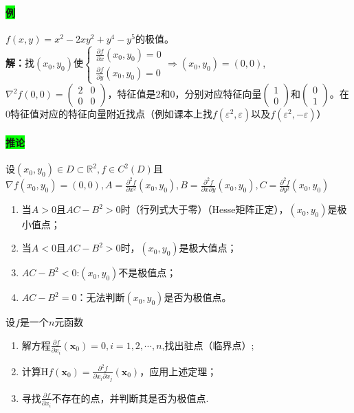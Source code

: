\documentclass[UTF8]{ctexart}
\newcommand{\p}[2]{\frac{\partial #1}{\partial #2}}
\newcommand{\x}{\boldsymbol{x}}
\begin{document}
    \paragraph{\colorbox{lime}{例}}$f(x,y)=x^2-2xy^2+y^4-y^5$的极值。\\
    \textbf{解：}找$(x_0,y_0)$使$\begin{cases}
        \p{f}{x}(x_0,y_0)=0\\
        \p{f}{y}(x_0,y_0)=0
    \end{cases}\Rightarrow (x_0,y_0)=(0,0)$,$\nabla^2f(0,0)=\begin{pmatrix}
        2&0\\
        0&0
    \end{pmatrix}$，特征值是2和0，分别对应特征向量$\begin{pmatrix}
        1\\
        0
    \end{pmatrix}$和$\begin{pmatrix}
        0\\
        1
    \end{pmatrix}$。在0特征值对应的特征向量附近找点（例如课本上找$f(\varepsilon^2,\varepsilon)$以及$f(\varepsilon^2,-\varepsilon)$）

    \paragraph{\colorbox{lime}{推论}}设$(x_0,y_0)\in D\subset\mathbb{R}^2,f\in C^2(D)$且$\nabla f(x_0,y_0)=(0,0),A=\frac{\partial^2f}{\partial x^2}(x_0,y_0),B=\frac{\partial^2f}{\partial x\partial y}(x_0,y_0),C=\frac{\partial^2f}{\partial y^2}(x_0,y_0)$
    \begin{enumerate}
        \item 当$A>0$且$AC-B^2>0$时（行列式大于零）（Hesse矩阵正定），$(x_0,y_0)$是极小值点；
        \item 当$A<0$且$AC-B^2>0$时，$(x_0,y_0)$是极大值点；
        \item $AC-B^2<0$:$(x_0,y_0)$不是极值点；
        \item $AC-B^2=0$：无法判断$(x_0,y_0)$是否为极值点。
    \end{enumerate}

    \begin{tcolorbox}[colback=red!5!white,arc=1mm,colframe=red!75!black,fonttitle=\bfseries,title=总结：求多元极值的步骤]
        设$f$是一个$n$元函数
    \begin{enumerate}[1)]
        \item 解方程$\p{f}{x_i}(\x_0)=0,i=1,2,\cdots,n$,找出驻点（临界点）;
        \item 计算$\mathrm{H}f(\x_0)=\frac{\partial^2f}{\partial x_i\partial x_j}(\x_0)$，应用上述定理；
        \item 寻找$\p{f}{x_i}$不存在的点，并判断其是否为极值点.
    \end{enumerate}
    \end{tcolorbox}
\end{document}
